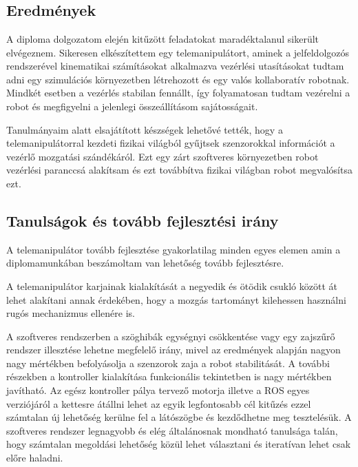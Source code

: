 \chapter{\osszefoglalas}

\section{Eredmények}
A diploma dolgozatom elején kitűzött feladatokat maradéktalanul sikerült elvégeznem. Sikeresen elkészítettem egy telemanipulátort, aminek a jelfeldolgozós rendszerével kinematikai számításokat alkalmazva vezérlési utasításokat tudtam adni egy szimulációs környezetben létrehozott és egy valós kollaboratív robotnak. Mindkét esetben a vezérlés stabilan fennállt, így folyamatosan tudtam vezérelni a robot és megfigyelni a jelenlegi összeállításom sajátosságait.

Tanulmányaim alatt elsajátított készségek lehetővé tették, hogy a telemanipulátorral kezdeti fizikai világból gyűjtsek szenzorokkal információt a vezérlő mozgatási szándékáról. Ezt egy zárt szoftveres környezetben robot vezérlési paranccsá alakítsam és ezt továbbítva fizikai világban robot megvalósítsa ezt.


\section{Tanulságok és tovább fejlesztési irány} 

A telemanipulátor tovább fejlesztése gyakorlatilag minden egyes elemen amin a diplomamunkában beszámoltam van lehetőség tovább fejlesztésre.

A telemanipulátor karjainak kialakítását a negyedik és ötödik csukló között át lehet alakítani annak érdekében, hogy a mozgás tartományt kilehessen használni rugós mechanizmus ellenére is.

A szoftveres rendszerben a szöghibák egységnyi csökkentése vagy egy zajszűrő rendszer illesztése lehetne megfelelő irány, mivel az eredmények alapján nagyon nagy mértékben befolyásolja a szenzorok zaja a robot stabilitását. A további részekben a kontroller kialakítása funkcionális tekintetben is nagy mértékben javítható. Az egész kontroller pálya tervező motorja illetve a ROS egyes verziójáról a kettesre átállni lehet az egyik legfontosabb cél kitűzés ezzel számtalan új lehetőség kerülne fel a látószögbe és kezdődhetne meg tesztelésük. A szoftveres rendszer legnagyobb és elég általánosnak mondható tanulsága talán, hogy számtalan megoldási lehetőség közül lehet választani és iteratívan lehet csak előre haladni.

